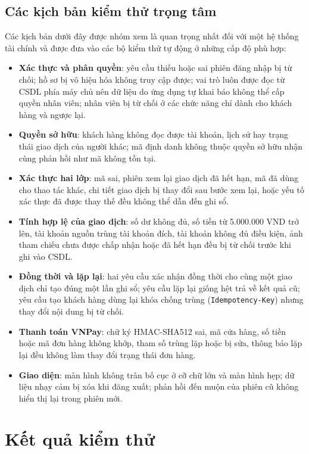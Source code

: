 \subsection{Các kịch bản kiểm thử trọng tâm}

Các kịch bản dưới đây được nhóm xem là quan trọng nhất đối với một hệ thống tài chính và được đưa vào các bộ kiểm thử tự động ở những cấp độ phù hợp:
\begin{itemize}
	\item \textbf{Xác thực và phân quyền}: yêu cầu thiếu hoặc sai phiên đăng nhập bị từ chối; hồ sơ bị vô hiệu hóa không truy cập được; vai trò luôn được đọc từ CSDL phía máy chủ nên dữ liệu do ứng dụng tự khai báo không thể cấp quyền nhân viên; nhân viên bị từ chối ở các chức năng chỉ dành cho khách hàng và ngược lại.
	\item \textbf{Quyền sở hữu}: khách hàng không đọc được tài khoản, lịch sử hay trạng thái giao dịch của người khác; mã định danh không thuộc quyền sở hữu nhận cùng phản hồi như mã không tồn tại.
	\item \textbf{Xác thực hai lớp}: mã sai, phiên xem lại giao dịch đã hết hạn, mã đã dùng cho thao tác khác, chi tiết giao dịch bị thay đổi sau bước xem lại, hoặc yếu tố xác thực đã được thay thế đều không thể dẫn đến ghi sổ.
	\item \textbf{Tính hợp lệ của giao dịch}: số dư không đủ, số tiền từ 5.000.000 VND trở lên, tài khoản nguồn trùng tài khoản đích, tài khoản không đủ điều kiện, ảnh tham chiếu chưa được chấp nhận hoặc đã hết hạn đều bị từ chối trước khi ghi vào CSDL.
	\item \textbf{Đồng thời và lặp lại}: hai yêu cầu xác nhận đồng thời cho cùng một giao dịch chỉ tạo đúng một lần ghi sổ; yêu cầu lặp lại giống hệt trả về kết quả cũ; yêu cầu tạo khách hàng dùng lại khóa chống trùng (\texttt{Idempotency-\allowbreak{}Key}) nhưng thay đổi nội dung bị từ chối.
	\item \textbf{Thanh toán VNPay}: chữ ký HMAC-SHA512 sai, mã cửa hàng, số tiền hoặc mã đơn hàng không khớp, tham số trùng lặp hoặc bị sửa, thông báo lặp lại đều không làm thay đổi trạng thái đơn hàng.
	\item \textbf{Giao diện}: màn hình không tràn bố cục ở cỡ chữ lớn và màn hình hẹp; dữ liệu nhạy cảm bị xóa khi đăng xuất; phản hồi đến muộn của phiên cũ không hiển thị lại trong phiên mới.
\end{itemize}

\section{Kết quả kiểm thử}
\label{sec:ch5-ket-qua}

